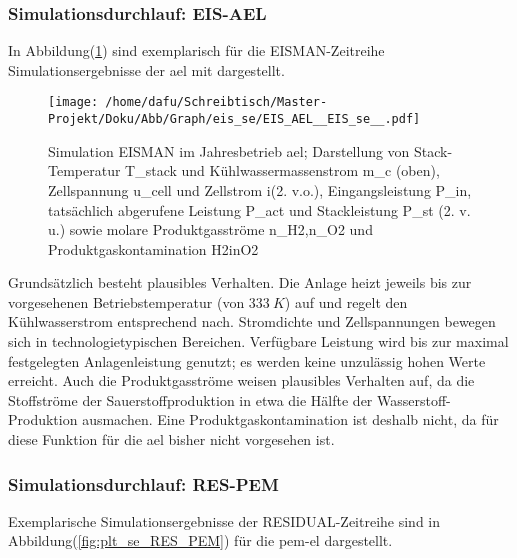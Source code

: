 \documentclass[onecolumn,10pt,titlepage]{article}
\begin{document}
\subsubsection{Simulationsdurchlauf: EIS-AEL}
In Abbildung(\ref{fig:plt_se_EIS_AEL}) sind exemplarisch für die EISMAN-Zeitreihe Simulationsergebnisse der \gls{ael} mit dargestellt. 
\begin{figure}[H]
	\centering
	\texttt{[image: /home/dafu/Schreibtisch/Master-Projekt/Doku/Abb/Graph/eis\_se/EIS\_AEL\_\_EIS\_se\_\_.pdf]}
	
	\caption[Simulation EISMAN im Jahresbetrieb \gls{ael}]{Simulation EISMAN im Jahresbetrieb \gls{ael}; Darstellung von Stack-Temperatur \gls{T_stack} und Kühlwassermassenstrom \gls{m_c} (oben), Zellspannung \gls{u_cell} und Zellstrom \gls{i}(2. v.o.), Eingangsleistung \gls{P_in},  tatsächlich abgerufene Leistung \gls{P_act} und Stackleistung \gls{P_st} (2. v. u.) sowie molare Produktgasströme \gls{n_H2},\gls{n_O2} und Produktgaskontamination \gls{H2inO2}}
	\label{fig:plt_se_EIS_AEL} 
\end{figure}
Grundsätzlich besteht plausibles Verhalten. Die Anlage heizt jeweils bis zur vorgesehenen Betriebstemperatur (von $333~K$) auf und regelt den Kühlwasserstrom entsprechend nach. Stromdichte und Zellspannungen bewegen sich in technologietypischen Bereichen.
Verfügbare Leistung wird bis zur maximal festgelegten Anlagenleistung genutzt; es werden keine unzulässig hohen Werte erreicht. Auch die Produktgasströme weisen plausibles Verhalten auf, da die Stoffströme der Sauerstoffproduktion in etwa die Hälfte der Wasserstoff-Produktion ausmachen. Eine Produktgaskontamination ist deshalb nicht, da für diese Funktion für die \gls{ael} bisher nicht vorgesehen ist.


\subsubsection{Simulationsdurchlauf: RES-PEM}
Exemplarische Simulationsergebnisse der RESIDUAL-Zeitreihe sind in Abbildung(\ref{fig:plt_se_RES_PEM}) für die \gls{pem}-\gls{el} dargestellt.\\
\end{document}
